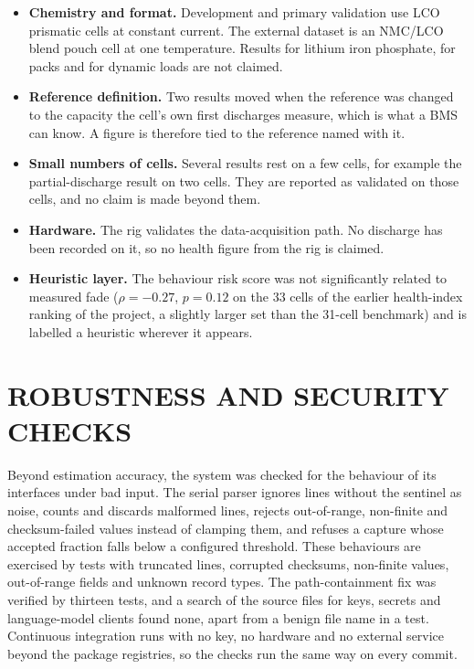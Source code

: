 \begin{itemize}
	\item \textbf{Chemistry and format.} Development and primary validation use LCO prismatic cells at constant current. The external dataset is an NMC/LCO blend pouch cell at one temperature. Results for lithium iron phosphate, for packs and for dynamic loads are not claimed.
	\item \textbf{Reference definition.} Two results moved when the reference was changed to the capacity the cell's own first discharges measure, which is what a BMS can know. A figure is therefore tied to the reference named with it.
	\item \textbf{Small numbers of cells.} Several results rest on a few cells, for example the partial-discharge result on two cells. They are reported as validated on those cells, and no claim is made beyond them.
	\item \textbf{Hardware.} The rig validates the data-acquisition path. No discharge has been recorded on it, so no health figure from the rig is claimed.
	\item \textbf{Heuristic layer.} The behaviour risk score was not significantly related to measured fade ($\rho=-0.27$, $p=0.12$ on the 33 cells of the earlier health-index ranking of the project, a slightly larger set than the 31-cell benchmark) and is labelled a heuristic wherever it appears.
\end{itemize}

\section{ROBUSTNESS AND SECURITY CHECKS}

Beyond estimation accuracy, the system was checked for the behaviour of its interfaces under bad input. The serial parser ignores lines without the sentinel as noise, counts and discards malformed lines, rejects out-of-range, non-finite and checksum-failed values instead of clamping them, and refuses a capture whose accepted fraction falls below a configured threshold. These behaviours are exercised by tests with truncated lines, corrupted checksums, non-finite values, out-of-range fields and unknown record types. The path-containment fix was verified by thirteen tests, and a search of the source files for keys, secrets and language-model clients found none, apart from a benign file name in a test. Continuous integration runs with no key, no hardware and no external service beyond the package registries, so the checks run the same way on every commit.

